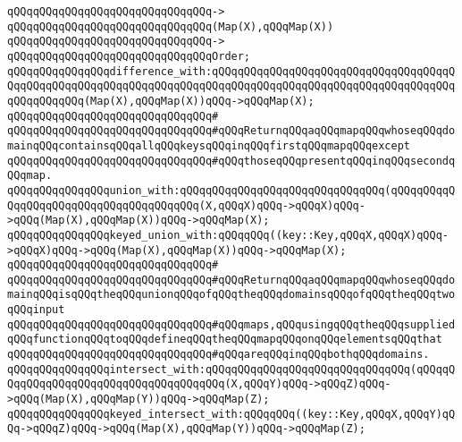 \verb|qQQqqQQqqQQqqQQqqQQqqQQqqQQqqQQq->|\newline
\verb|qQQqqQQqqQQqqQQqqQQqqQQqqQQqqQQq(Map(X),qQQqMap(X))|\newline
\verb|qQQqqQQqqQQqqQQqqQQqqQQqqQQqqQQq->|\newline
\verb|qQQqqQQqqQQqqQQqqQQqqQQqqQQqqQQqOrder;|\newline
\newline
\newline
\verb|qQQqqQQqqQQqqQQqdifference_with:qQQqqQQqqQQqqQQqqQQqqQQqqQQqqQQqqQQqqQQqqQQqqQQqqQQqqQQqqQQqqQQqqQQqqQQqqQQqqQQqqQQqqQQqqQQqqQQqqQQqqQQqqQQqqQQqqQQqqQQq(Map(X),qQQqMap(X))qQQq->qQQqMap(X);|\newline
\verb|qQQqqQQqqQQqqQQqqQQqqQQqqQQqqQQq#|\newline
\verb|qQQqqQQqqQQqqQQqqQQqqQQqqQQqqQQq#qQQqReturnqQQqaqQQqmapqQQqwhoseqQQqdomainqQQqcontainsqQQqallqQQqkeysqQQqinqQQqfirstqQQqmapqQQqexcept|\newline
\verb|qQQqqQQqqQQqqQQqqQQqqQQqqQQqqQQq#qQQqthoseqQQqpresentqQQqinqQQqsecondqQQqmap.|\newline
\newline
\verb|qQQqqQQqqQQqqQQqunion_with:qQQqqQQqqQQqqQQqqQQqqQQqqQQqqQQq(qQQqqQQqqQQqqQQqqQQqqQQqqQQqqQQqqQQqqQQq(X,qQQqX)qQQq->qQQqX)qQQq->qQQq(Map(X),qQQqMap(X))qQQq->qQQqMap(X);|\newline
\verb|qQQqqQQqqQQqqQQqkeyed_union_with:qQQqqQQq((key::Key,qQQqX,qQQqX)qQQq->qQQqX)qQQq->qQQq(Map(X),qQQqMap(X))qQQq->qQQqMap(X);|\newline
\verb|qQQqqQQqqQQqqQQqqQQqqQQqqQQqqQQq#|\newline
\verb|qQQqqQQqqQQqqQQqqQQqqQQqqQQqqQQq#qQQqReturnqQQqaqQQqmapqQQqwhoseqQQqdomainqQQqisqQQqtheqQQqunionqQQqofqQQqtheqQQqdomainsqQQqofqQQqtheqQQqtwoqQQqinput|\newline
\verb|qQQqqQQqqQQqqQQqqQQqqQQqqQQqqQQq#qQQqmaps,qQQqusingqQQqtheqQQqsuppliedqQQqfunctionqQQqtoqQQqdefineqQQqtheqQQqmapqQQqonqQQqelementsqQQqthat|\newline
\verb|qQQqqQQqqQQqqQQqqQQqqQQqqQQqqQQq#qQQqareqQQqinqQQqbothqQQqdomains.|\newline
\newline
\verb|qQQqqQQqqQQqqQQqintersect_with:qQQqqQQqqQQqqQQqqQQqqQQqqQQqqQQq(qQQqqQQqqQQqqQQqqQQqqQQqqQQqqQQqqQQqqQQq(X,qQQqY)qQQq->qQQqZ)qQQq->qQQq(Map(X),qQQqMap(Y))qQQq->qQQqMap(Z);|\newline
\verb|qQQqqQQqqQQqqQQqkeyed_intersect_with:qQQqqQQq((key::Key,qQQqX,qQQqY)qQQq->qQQqZ)qQQq->qQQq(Map(X),qQQqMap(Y))qQQq->qQQqMap(Z);|\newline
